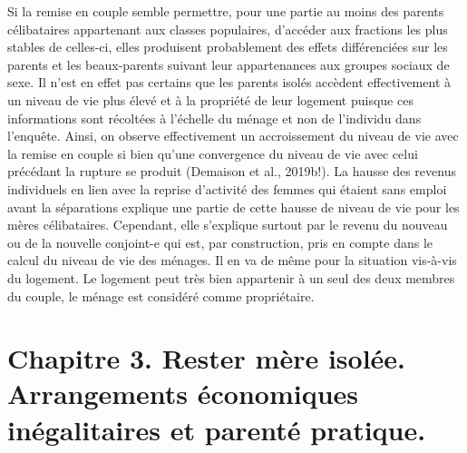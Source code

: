 \documentclass[
  12pt,
]{book}
\begin{document}
Si la remise en couple semble permettre, pour une partie au moins des
parents célibataires appartenant aux classes populaires, d'accéder aux
fractions les plus stables de celles-ci, elles produisent probablement
des effets différenciées sur les parents et les beaux-parents suivant
leur appartenances aux groupes sociaux de sexe. Il n'est en effet pas
certains que les parents isolés accèdent effectivement à un niveau de
vie plus élevé et à la propriété de leur logement puisque ces
informations sont récoltées à l'échelle du ménage et non de l'individu
dans l'enquête. Ainsi, on observe effectivement un accroissement du
niveau de vie avec la remise en couple si bien qu'une convergence du
niveau de vie avec celui précédant la rupture se produit (Demaison et
al., 2019b!). La hausse des revenus individuels en lien avec la reprise
d'activité des femmes qui étaient sans emploi avant la séparations
explique une partie de cette hausse de niveau de vie pour les mères
célibataires. Cependant, elle s'explique surtout par le revenu du
nouveau ou de la nouvelle conjoint-e qui est, par construction, pris en
compte dans le calcul du niveau de vie des ménages. Il en va de même
pour la situation vis-à-vis du logement. Le logement peut très bien
appartenir à un seul des deux membres du couple, le ménage est considéré
comme propriétaire.

\chapter{Chapitre 3. Rester mère isolée. Arrangements économiques
inégalitaires et parenté
pratique.}\label{chapitre-3.-rester-muxe8re-isoluxe9e.-arrangements-uxe9conomiques-inuxe9galitaires-et-parentuxe9-pratique.}
\end{document}
